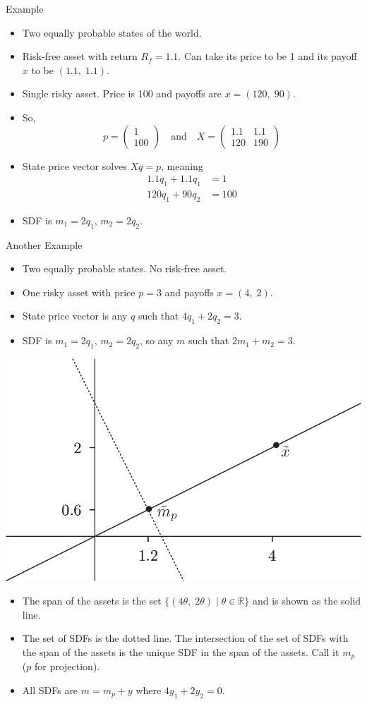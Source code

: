 \documentclass[10pt]{beamer}
\newcommand{\bi}{\begin{itemize}}
\newcommand{\ei}{\end{itemize}}
\newcommand{\im}{\item}
\newcommand{\myreal}{\ensuremath{\mathbb{R}}}
\begin{document}
\begin{frame}{Example}
    \bi \im Two equally probable states of the world.
    \im Risk-free asset with return $R_f=1.1$.  Can take its price to be 1 and its payoff $x$ to be $(1.1, \; 1.1)$.
    \im Single risky asset. Price is 100 and payoffs are $x = (120, \; 90)$. 
    \im So,
    $$p = \begin{pmatrix} 1 \\ 100 \end{pmatrix} \quad \text{and} \quad X = \begin{pmatrix} 1.1 & 1.1 \\ 120 & 190 \end{pmatrix}$$
    \im State price vector solves $Xq = p$, meaning
     \begin{align*}
     1.1q_1  + 1.1q_1 & = 1  \\
    120q_1  + 90q_2 &= 100
    \end{align*}
    \im SDF is $m_1 = 2q_1$, $m_2 = 2 q_2$.  
    \ei
\end{frame}

\begin{frame}{Another Example}
\bi 
\im Two equally probable states.  No risk-free asset.  \im One risky asset with price $p=3$ and payoffs $x = (4, \; 2)$. 
\im State price vector is any $q$ such that $4q_1 + 2q_2 = 3$.
\im SDF is $m_1 = 2q_1$, $m_2=2q_2$, so any $m$ such that $2m_1 + m_2 = 3$.
\ei 
\end{frame}

\begin{frame}
\begin{center}
\includegraphics[scale=.7]{images/fig3_2.png}
\end{center}
\bi  \im
The span of the assets is the set $\{(4\theta,\; 2\theta) \mid \theta \in \myreal\}$ and is shown as the solid line.  
\im The set of SDFs is the dotted line.  The intersection of the set of SDFs with the span of the assets is the unique SDF in the span of the assets.  Call it $m_p$ ($p$ for projection). 
\im All SDFs are $m = m_p + y$ where $4y_1 + 2y_2 = 0$.
\ei
\end{frame}
\end{document}

